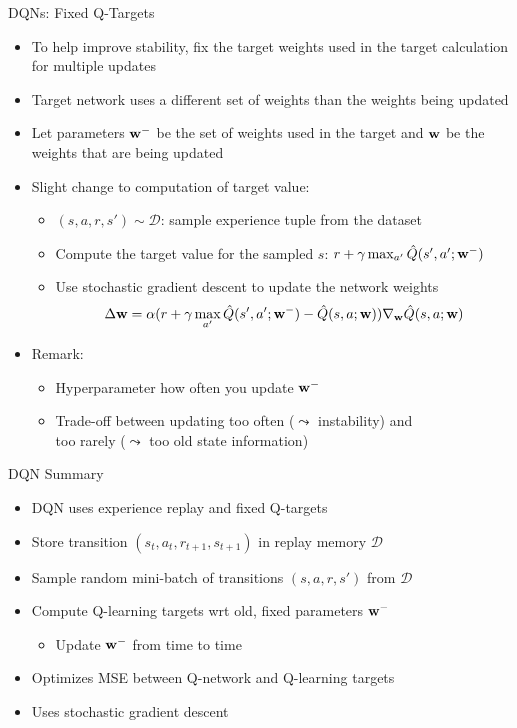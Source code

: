 \documentclass[aspectratio=169]{../latex_main/tntbeamer}  %
\begin{document}
\begin{frame}[c]{DQNs: Fixed Q-Targets}
	\vspace{-1em}
	\begin{itemize}
		\item To help improve stability, fix the \alert{target weights} used in the target calculation for multiple updates
		\item Target network uses a different set of weights than the weights being updated
		\item Let parameters $\mathbf{w}^-$ be the set of weights used in the target and $\mathbf{w}$ be the weights that are being updated
		\item Slight change to computation of target value:
		\begin{itemize}
			\item $(s,a,r,s')\sim \mathcal{D}$: sample experience tuple from the dataset
			\item Compute the target value for the sampled $s$: $r+\gamma \max_{a'} \hat{Q}(s',a';\mathbf{w}^-)$
			\item Use stochastic gradient descent to update the network weights
			$$\Delta \mathbf{w} = \alpha (r + \gamma \max_{a'} \hat{Q}(s',a';\mathbf{w}^-) - \hat{Q}(s,a;\mathbf{w})) \nabla_{\mathbf{w}}\hat{Q}(s,a;\mathbf{w})$$
		\end{itemize}
		\smallskip 
		\pause
		\item Remark:
		\begin{itemize}
			\item Hyperparameter how often you update $\mathbf{w}^-$
			\item Trade-off between updating too often ($\leadsto$ instability) and\\ too rarely ($\leadsto$ too old state information)
		\end{itemize}
	\end{itemize}
	
\end{frame}
\begin{frame}[c]{DQN Summary}
	
	\begin{itemize}
		\item DQN uses experience replay and fixed Q-targets
		\item Store transition $(s_t, a_t, r_{t+1}, s_{t+1})$ in replay memory $\mathcal{D}$
		\item Sample random mini-batch of transitions $(s,a,r,s')$ from $\mathcal{D}$
		\item Compute Q-learning targets wrt old, fixed parameters $\mathbf{w}^-$
		\begin{itemize}
			\item Update $\mathbf{w}^-$ from time to time
		\end{itemize}
		\item Optimizes MSE between Q-network and Q-learning targets
		\item Uses stochastic gradient descent
	\end{itemize}
	
\end{frame}
\end{document}
